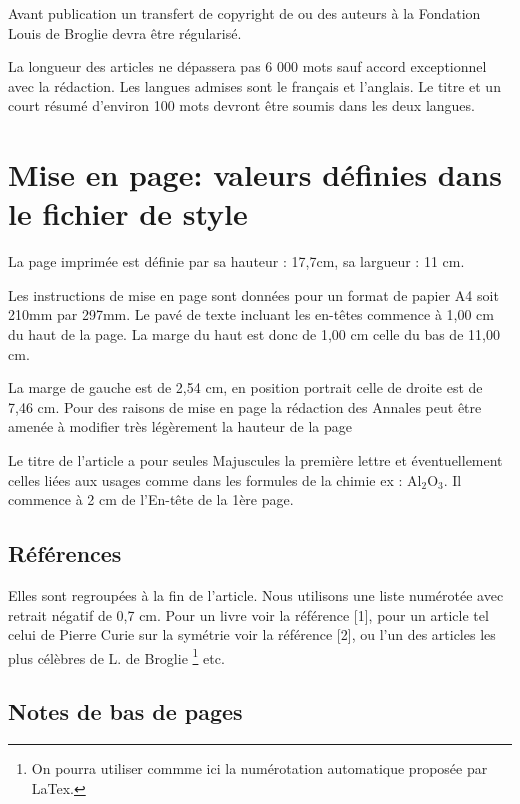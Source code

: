 \documentclass[10pt,twoside,a5paper]{article}
\begin{document}
Avant publication un transfert de copyright de ou des auteurs \`a la Fondation
Louis de Broglie devra \^etre r\'egularis\'e.  

La longueur des articles ne d\'epassera
pas 6 000 mots sauf accord exceptionnel avec la r\'edaction.  Les langues admises
sont le fran\c cais et l'anglais. Le titre et un court r\'esum\'e d'environ 100 mots
devront \^etre soumis dans les deux langues.

\section{Mise en page: valeurs d\'efinies dans le fichier de style}

La page imprim\'ee est d\'efinie par sa hauteur : 17,7cm, sa largueur : 11 cm.

Les instructions de mise en page sont donn\'ees pour un format de papier A4 soit
210mm par 297mm.  Le pav\'e de texte incluant les en-t\^etes commence \`a 1,00 cm du
haut de la page. La marge du haut est donc de 1,00 cm celle du bas de 11,00 cm. 

La marge de gauche est de 2,54 cm, en position portrait celle de droite est de
7,46 cm. Pour des raisons de mise en page la r\'edaction des Annales peut \^etre
amen\'ee \`a modifier tr\`es l\'eg\`erement la hauteur de la page

Le titre de l'article a pour seules Majuscules la premi\`ere lettre et
\'eventuellement celles li\'ees aux usages comme dans les formules de la chimie ex :
Al$_2$O$_3$.  Il commence \`a 2 cm de l'En-t\^ete de la 1\`ere page.


\subsection {R\'ef\'erences} 

Elles sont regroup\'ees \`a la fin de l'article. Nous utilisons une
liste num\'erot\'ee avec retrait n\'egatif de 0,7 cm. Pour un livre voir la r\'ef\'erence
[1], pour un article tel celui de Pierre Curie sur la sym\'etrie 
voir la r\'ef\'erence [2], ou l'un des articles les plus c\'el\`ebres de L.
de Broglie \cite{Broglie2}%
\footnote{On pourra utiliser commme ici la num\'erotation automatique propos\'ee par
LaTex.}
 etc. 

\subsection{Notes de bas de pages} 
\end{document}
